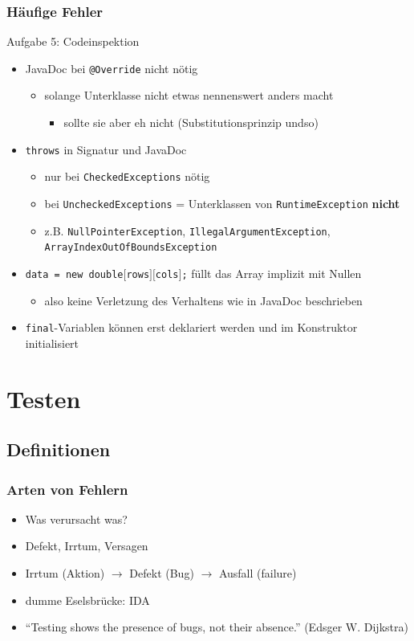 \documentclass[18pt]{beamer}
\begin{document}
	\begin{frame}
		\frametitle{Häufige Fehler}
		\begin{block}{Aufgabe 5: Codeinspektion}
			\begin{itemize} \pause
				\item JavaDoc bei \texttt{@Override} nicht nötig
				\begin{itemize}
					\item solange Unterklasse nicht etwas nennenswert anders macht
					\begin{itemize}
						\item sollte sie aber eh nicht (Substitutionsprinzip undso)
					\end{itemize}
				\end{itemize}
				\pause
				\item \texttt{throws} in Signatur und JavaDoc
				\begin{itemize}
					\item nur bei \texttt{CheckedExceptions} nötig
					\item bei \texttt{UncheckedExceptions} = Unterklassen von \texttt{RuntimeException} \textbf{nicht}
					\item z.B. \texttt{NullPointerException}, \texttt{IllegalArgumentException}, \texttt{ArrayIndexOutOfBoundsException}
				\end{itemize}
				\pause
				\item \texttt{data = new double$\lbrack$rows$\rbrack\lbrack$cols$\rbrack$;} füllt das Array implizit mit Nullen
				\begin{itemize}
					\item also keine Verletzung des Verhaltens wie in JavaDoc beschrieben
				\end{itemize} \pause
				\item \texttt{final}-Variablen können erst deklariert werden und im Konstruktor initialisiert
			\end{itemize}
		\end{block}
	\end{frame}
		
\section{Testen}
	\subsection{Definitionen}
	
	\begin{frame}
		\frametitle{Arten von Fehlern}
		\begin{itemize}
			\item Was verursacht was?
			\item Defekt, Irrtum, Versagen \pause
			\item Irrtum (Aktion) $\rightarrow$ Defekt (Bug) $\rightarrow$ Ausfall (failure)
			\item dumme Eselsbrücke: IDA
			\pause
			\item \enquote{Testing shows the presence of bugs, not their absence.} (Edsger W. Dijkstra)
		\end{itemize}
	\end{frame}
\end{document}
